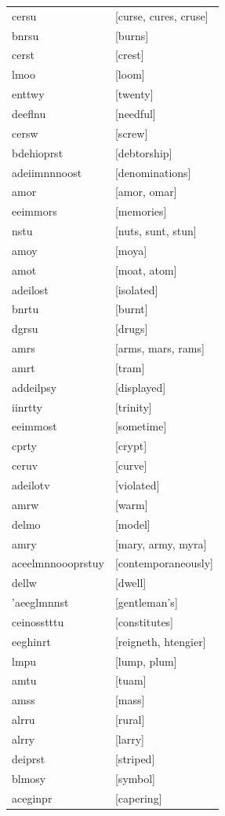 \documentclass{article}
\begin{document}
\begin{tabular}{ll}
cersu & [curse, cures, cruse] \\
bnrsu & [burns] \\
cerst & [crest] \\
lmoo & [loom] \\
enttwy & [twenty] \\
deeflnu & [needful] \\
cersw & [screw] \\
bdehioprst & [debtorship] \\
adeiimnnnoost & [denominations] \\
amor & [amor, omar] \\
eeimmors & [memories] \\
nstu & [nuts, sunt, stun] \\
amoy & [moya] \\
amot & [moat, atom] \\
adeilost & [isolated] \\
bnrtu & [burnt] \\
dgrsu & [drugs] \\
amrs & [arms, mars, rams] \\
amrt & [tram] \\
addeilpsy & [displayed] \\
iinrtty & [trinity] \\
eeimmost & [sometime] \\
cprty & [crypt] \\
ceruv & [curve] \\
adeilotv & [violated] \\
amrw & [warm] \\
delmo & [model] \\
amry & [mary, army, myra] \\
aceelmnnoooprstuy & [contemporaneously] \\
dellw & [dwell] \\
'aeeglmnnst & [gentleman's] \\
ceinosstttu & [constitutes] \\
eeghinrt & [reigneth, htengier] \\
lmpu & [lump, plum] \\
amtu & [tuam] \\
amss & [mass] \\
alrru & [rural] \\
alrry & [larry] \\
deiprst & [striped] \\
blmosy & [symbol] \\
aceginpr & [capering] \\

\end{tabular}
\end{document}

